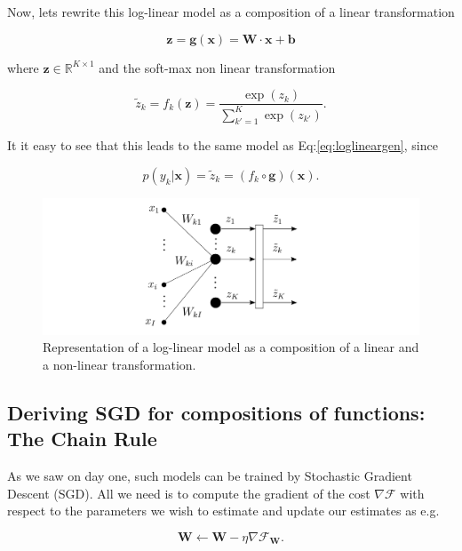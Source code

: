 \noindent Now, lets rewrite this log-linear model as a composition of a linear
transformation 

\begin{equation}
\mathbf{z} = \mathbf{g}(\mathbf{x}) = \mathbf{W} \cdot \mathbf{x} + \mathbf{b}
\label{eq:linear}
\end{equation}

\noindent where $\mathbf{z} \in \mathbb{R}^{K \times 1}$ and the soft-max non
linear transformation

\begin{equation}
\tilde{z}_k = f_k(\mathbf{z}) = \frac{\exp(z_k)}{\sum_{k'=1}^K \exp(z_{k'})}.
\label{eq:softmax}
\end{equation}

\noindent It it easy to see that this leads to the same model as
Eq:\ref{eq:loglineargen}, since

\begin{equation}
p(y_k|\mathbf{x}) = \tilde{z}_k = (f_k \circ \mathbf{g})(\mathbf{x}). 
\end{equation}

\begin{figure}
\centering
\includegraphics[scale=0.4]{figs/deep_learning/LayerP.pdf}
\caption{Representation of a log-linear model as a composition of a linear and
a non-linear transformation.}
\label{fig:LayerP}
\end{figure}

\subsection{Deriving SGD for compositions of functions: The Chain Rule}

As we saw on day one, such models can be trained by Stochastic Gradient Descent
(SGD). All we need is to compute the gradient of the cost $\nabla\mathcal{F}$
with respect to the parameters we wish to estimate and update our estimates as
e.g.

\begin{equation}
\mathbf{W} \leftarrow \mathbf{W} - \eta \nabla\mathcal{F}_\mathbf{W}. 
\end{equation}


